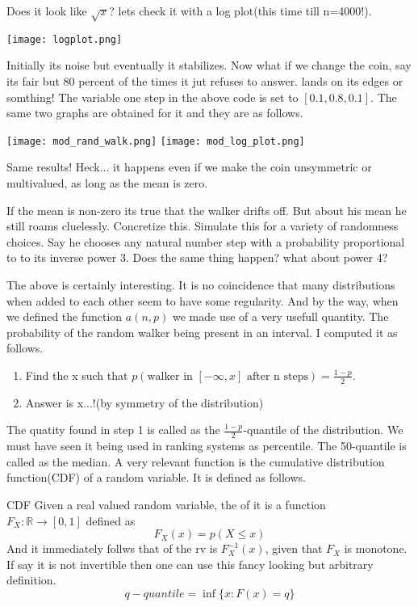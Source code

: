 \documentclass{myclass}
\begin{document}
\begin{example}
Does it look like $\sqrt{x}$? lets check it with a log plot(this time till n=4000!).
\begin{center}
    \texttt{[image: logplot.png]}
\end{center}
Initially its noise but eventually it stabilizes. Now what if we change the coin, say its fair but 80 percent of the times it jut refuses to answer. lands on its edges or somthing!
The variable one step in the above code is set to $[0.1,0.8,0.1]$. The same two graphs are obtained for it and they are as follows.
\begin{center}
    \texttt{[image: mod\_rand\_walk.png]}
    \texttt{[image: mod\_log\_plot.png]}
\end{center}
Same results! Heck... it happens even if we make the coin unsymmetric or multivalued, as long as the mean is zero.
\begin{exe}
    If the mean is non-zero its true that the walker drifts off. But about his mean he still roams cluelessly. Concretize this. Simulate this for a variety of randomness choices. Say he chooses any natural number step with a probability
    proportional to to its inverse power 3. Does the same thing happen? what about power 4?
\end{exe}
\end{example}
The above is certainly interesting. It is no coincidence that many distributions when added to each other seem to have some regularity. And by the way, when we defined the function
$a(n,p)$ we made use of a very usefull quantity. The probability of the random walker being present in an interval. I computed it as follows. 
\begin{enumerate}
    \item Find the x such that $p(\text{walker in }[-\infty,x]\text{ after n steps})=\frac{1-p}{2}$.
    \item Answer is x...!(by symmetry of the distribution)
\end{enumerate}
The quatity found in step 1 is called as the $\frac{1-p}{2}$-quantile of the distribution. We must have seen it being used in ranking systems as percentile. The 50-quantile is called as the median.
A very relevant function is the cumulative distribution function(CDF) of a random variable. It is defined as follows.
\begin{bluthm}{CDF}
    Given a real valued random variable, the  of it is a function \\$F_X:\mathbb{R}\to[0,1]$ defined as $$F_X(x)=p(X\leq x)$$
    And it immediately follws that  of the rv is $F_X^{-1}(x)$, given that $F_X$ is monotone. If say it is not invertible then one can use this fancy looking but arbitrary definition.
    $$q-quantile=\inf \{x: F(x) = q\}$$
\end{bluthm}
\end{document}
